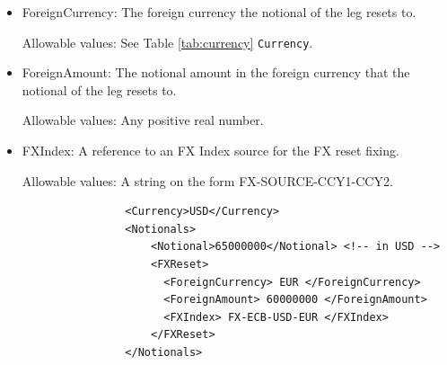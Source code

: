 \begin{itemize}
FX Resets,  used for Rebalancing Cross-currency swaps, can be specified using an \lstinline!FXReset! child element with the following subelements:  See Listing \ref{lst:notional_fxreset} for an example. \break

\item ForeignCurrency: The foreign currency the notional of the leg resets to.  

Allowable values:  See Table \ref{tab:currency} \lstinline!Currency!.

\item ForeignAmount: The notional amount in the foreign currency that the notional of the leg resets to.  

Allowable values:  Any positive real number.

\item FXIndex: A reference to an FX Index source for the FX reset fixing. 

Allowable values:  A string on the form FX-SOURCE-CCY1-CCY2.







 \begin{listing}[H]
\begin{verbatim}
                <Currency>USD</Currency>
                <Notionals>
                    <Notional>65000000</Notional> <!-- in USD -->
                    <FXReset>
                      <ForeignCurrency> EUR </ForeignCurrency>
                      <ForeignAmount> 60000000 </ForeignAmount>
                      <FXIndex> FX-ECB-USD-EUR </FXIndex>
                    </FXReset>
                </Notionals>
\end{verbatim}
\caption{Notional list with fx reset}
\label{lst:notional_fxreset}
\end{listing}


\end{itemize}
